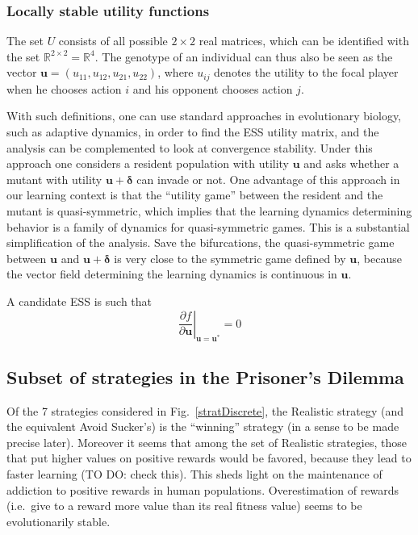 \documentclass[11pt,reqno]{amsart}
\newcommand{\na}{n}
\newcommand{\Rn}{\mathds{R}}
\newcommand{\fc}{f}
\newcommand{\pf}{u}
\newcommand{\vpf}{\mathbf{u}}
\newcommand{\Pf}{U}
\newcommand{\pd}{\partial}
\newcommand{\dv}{\delta}
\newcommand{\vd}{\boldsymbol{\dv}}
\begin{document}
\subsubsection{Locally stable utility functions}

The set $\Pf$ consists of all possible $2\times 2$ real matrices, which can be identified with the set $\Rn^{2\times 2}=\Rn^4$. The genotype of an individual can thus also be seen as the vector $\vpf = (\pf_{11},\pf_{12},\pf_{21},\pf_{22})$, where $\pf_{ij}$ denotes the utility to the focal player when he chooses action $i$ and his opponent chooses action $j$.

With such definitions, one can use standard approaches in evolutionary biology, such as adaptive dynamics, in order to find the ESS utility matrix, and the analysis can be complemented to look at convergence stability. Under this approach one considers a resident population with utility $\vpf$ and asks whether a mutant with utility $\vpf+\vd$ can invade or not. One advantage of this approach in our learning context is that the ``utility game'' between the resident and the mutant is quasi-symmetric, which implies that the learning dynamics determining behavior is a family of dynamics for quasi-symmetric games. This is a substantial simplification of the analysis. Save the bifurcations, the quasi-symmetric game between $\vpf$ and $\vpf+\vd$ is very close to the symmetric game defined by $\vpf$, because the vector field determining the learning dynamics is continuous in $\vpf$.

A candidate ESS is such that
\begin{equation}
\label{cES}
\left. \frac{\pd \fc}{\pd \vpf}\right|_{\vpf=\vpf^*} = 0 
\end{equation}









\subsection{Subset of strategies in the Prisoner's Dilemma}

Of the 7 strategies considered in Fig.~\ref{stratDiscrete}, the Realistic strategy (and the equivalent Avoid Sucker's) is the ``winning'' strategy (in a sense to be made precise later). Moreover it seems that among the set of Realistic strategies, those that put higher values on positive rewards would be favored, because they lead to faster learning (TO DO: check this). This sheds light on the maintenance of addiction to positive rewards in human populations. Overestimation of rewards (i.e.~give to a reward more value than its real fitness value) seems to be evolutionarily stable.
\end{document}
